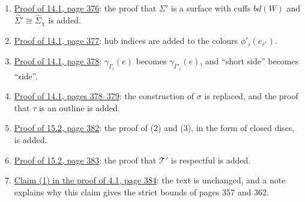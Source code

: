 \begin{enumerate}
\item {}\hyperref[fix:14.1-surface-added]{Proof of 14.1, page 376}: the proof that $\Sigma'$ is a
surface with cuffs $bd(W)$ and $\hat{\Sigma}' \cong \hat{\Sigma}_\chi$ is added.
\item {}\hyperref[fix:14.1-hub-index]{Proof of 14.1, page 377}: hub indices are added to the
colours $\phi'_i(e_{r^*})$.
\item {}\hyperref[fix:14.1-side]{Proof of 14.1, page 378}: $\gamma_{\Gamma_i}(e)$ becomes
$\gamma_{\Gamma'_i}(e)$, and ``short side'' becomes ``side''.
\item {}\hyperref[fix:14.1-outline-proof-added]{Proof of 14.1, pages 378--379}: the construction
of $\sigma$ is replaced, and the proof that $\tau$ is an outline is added.
\item {}\hyperref[fix:15.2-Sv-proof-added]{Proof of 15.2, page 382}: the proof of (2) and (3), in
the form of closed discs, is added.
\item {}\hyperref[fix:15.2-respectful-proof-added]{Proof of 15.2, page 383}: the proof that
$\mathscr{T}'$ is respectful is added.
\item {}\hyperref[fix:4.1-claim1]{Claim (1) in the proof of 4.1, page 384}: the text is unchanged,
and a note explains why this claim gives the strict bounds of pages 357 and 362.
\end{enumerate}
